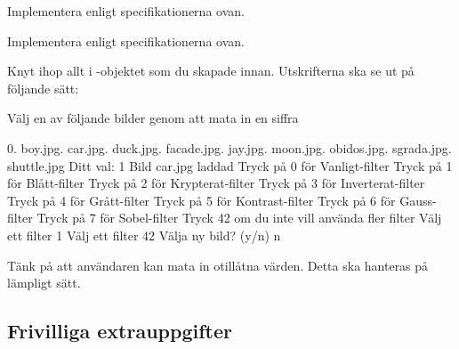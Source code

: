 \Task Implementera  enligt specifikationerna ovan.

\Task Implementera  enligt specifikationerna ovan.

\Task Knyt ihop allt i -objektet som du skapade innan. Utskrifterna ska se ut på följande sätt:

{\setlength{\parindent}{0cm}

 Välj en av följande bilder genom att mata in en siffra\newline

0. boy.jpg. car.jpg. duck.jpg. facade.jpg. jay.jpg. moon.jpg. obidos.jpg. sgrada.jpg. shuttle.jpg\newline
Ditt val: 1\newline
Bild car.jpg laddad\newline
Tryck på 0 för Vanligt-filter\newline
Tryck på 1 för Blått-filter\newline
Tryck på 2 för Krypterat-filter\newline
Tryck på 3 för Inverterat-filter\newline
Tryck på 4 för Grått-filter\newline
Tryck på 5 för Kontrast-filter\newline
Tryck på 6 för Gauss-filter\newline
Tryck på 7 för Sobel-filter\newline
Tryck 42 om du inte vill använda fler filter\newline
Välj ett filter 1\newline
Välj ett filter 42\newline
Välja ny bild? (y/n) n\newline
}

Tänk på att användaren kan mata in otillåtna värden. Detta ska hanteras på lämpligt sätt.

\subsection{Frivilliga extrauppgifter}

